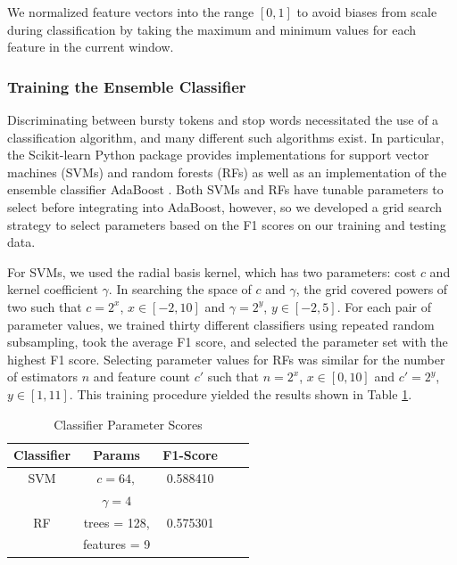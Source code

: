 \documentclass{acm_proc_article-sp}
\begin{document}
We normalized feature vectors into the range $[0, 1]$ to avoid biases from scale during classification by taking the maximum and minimum values for each feature in the current window.

\subsubsection{Training the Ensemble Classifier}

Discriminating between bursty tokens and stop words necessitated the use of a classification algorithm, and many different such algorithms exist.
In particular, the Scikit-learn Python package provides implementations for support vector machines (SVMs) and random forests (RFs) as well as an implementation of the ensemble classifier AdaBoost \cite{scikit-learn}.
Both SVMs and RFs have tunable parameters to select before integrating into AdaBoost, however, so we developed a grid search strategy to select parameters based on the F1 scores on our training and testing data.

For SVMs, we used the radial basis kernel, which has two parameters: cost $c$ and kernel coefficient $\gamma$.
In searching the space of $c$ and $\gamma$, the grid covered powers of two such that $c = 2^x$, $x \in [-2, 10]$ and $\gamma = 2^y$, $y \in [-2, 5]$.
For each pair of parameter values, we trained thirty different classifiers using repeated random subsampling, took the average F1 score, and selected the parameter set with the highest F1 score.
Selecting parameter values for RFs was similar for the number of estimators $n$ and feature count $c'$ such that $n = 2^x$, $x \in [0, 10]$ and $c' = 2^y$, $y \in [1, 11]$.
This training procedure yielded the results shown in Table \ref{tab:scores}.

\begin{table}[htdp]
\caption{Classifier Parameter Scores}
\begin{center}
\begin{tabular}{|c|c|c|c|c|}
\hline
\textbf{Classifier} & \textbf{Params} & \textbf{F1-Score} \\ \hline
SVM & $c=64,$ & 0.588410 \\ 
& $\gamma=4$ & \\ \hline
RF & trees = 128, & 0.575301 \\
& features = 9 &  \\ \hline
\end{tabular}
\end{center}
\label{tab:scores}
\end{table}
\end{document}
